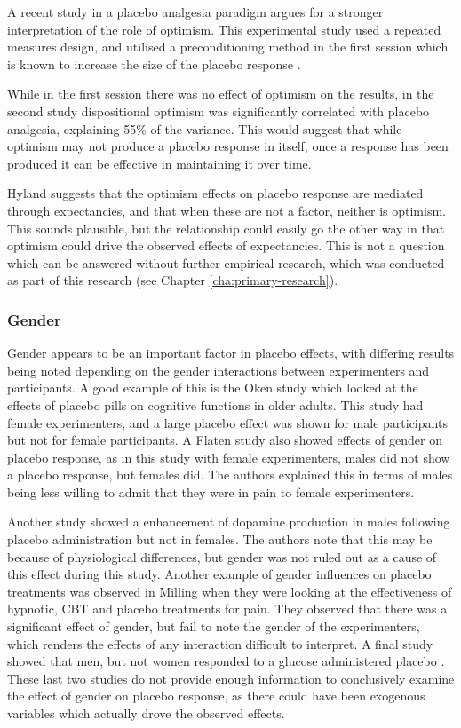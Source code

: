 A recent study \cite{morton2009reproducibility} in a placebo analgesia paradigm argues for a stronger interpretation of the role of optimism. This experimental study used a repeated measures design, and utilised a preconditioning method in the first session which is known to increase the size of the placebo response \cite{Voudouris1985}. 

While in the first session there was no effect of optimism on the results, in the second study dispositional optimism was significantly correlated with placebo analgesia, explaining 55\% of the variance. This would suggest that while optimism may not produce a placebo response in itself, once a response has been produced it can be effective in maintaining it over time. 

Hyland suggests that the optimism effects on placebo response are mediated through expectancies, and that when these are not a factor, neither is optimism. This sounds plausible, but the relationship could easily go the other way in that optimism could drive the observed effects of expectancies. This is not a question which can be answered without further empirical research, which was conducted as part of this research (see Chapter \ref{cha:primary-research}). 

\subsubsection{Gender}
\label{sec:gender}

Gender appears to be an important factor in placebo effects, with differing results being noted depending on the gender interactions between experimenters and participants. A good example of this is the Oken \cite{Oken2008} study which looked at the  effects of placebo pills on cognitive functions in older adults. This study had female experimenters, and a large placebo effect was shown for male participants but not for female participants. A Flaten \cite{Flaten2006} study also showed effects of gender on placebo response, as in this study with female experimenters, males did not show a placebo response, but females did. The authors explained this in terms of males being less willing to admit that they were in pain to female experimenters.

 Another study \cite{Zubieta2006} showed a enhancement of dopamine production in males following placebo administration but not in females. The authors note that this may be because of physiological differences, but gender was not ruled out as a cause of this effect during this study. Another example of gender influences on placebo treatments was observed in Milling \cite{Milling2007}  when they were looking at the effectiveness of hypnotic, CBT and placebo treatments for pain. They observed that there was a significant effect of gender, but fail to note the gender of the experimenters, which renders the effects of any interaction difficult to interpret. A final study showed that men, but not women responded to a glucose administered placebo \cite{Haltia2008}. These last two studies do not provide enough information to conclusively examine the effect of gender on placebo response, as there could have been exogenous variables which actually drove the observed effects. 


